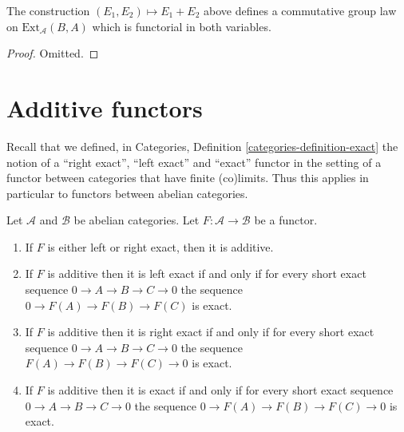 \begin{lemma}
\label{lemma-baer-sum}
The construction $(E_1, E_2) \mapsto E_1 + E_2$
above defines a commutative group
law on $\text{Ext}_\mathcal{A}(B, A)$ which is
functorial in both variables.
\end{lemma}

\begin{proof}
Omitted.
\end{proof}

\section{Additive functors}
\label{section-functors}

\noindent
Recall that we defined, in
Categories, Definition \ref{categories-definition-exact}
the notion of a ``right exact'', ``left exact'' and
``exact'' functor in the setting of a functor between
categories that have finite (co)limits. Thus this
applies in particular to functors between abelian
categories.

\begin{lemma}
\label{lemma-exact-functor}
Let $\mathcal{A}$ and $\mathcal{B}$ be abelian categories.
Let $F : \mathcal{A} \to \mathcal{B}$ be a functor.
\begin{enumerate}
\item If $F$ is either left or right exact, then it is additive.
\item If $F$ is additive then it is left exact if and only if
for every short exact sequence
$0 \to A \to B \to C \to 0$
the sequence $0 \to F(A) \to F(B) \to F(C)$
is exact.
\item If $F$ is additive then it is right exact if and only if
for every short exact sequence
$0 \to A \to B \to C \to 0$
the sequence $F(A) \to F(B) \to F(C) \to 0$
is exact.
\item If $F$ is additive then it is exact if and only if
for every short exact sequence
$0 \to A \to B \to C \to 0$
the sequence $0 \to F(A) \to F(B) \to F(C) \to 0$
is exact.
\end{enumerate}
\end{lemma}

